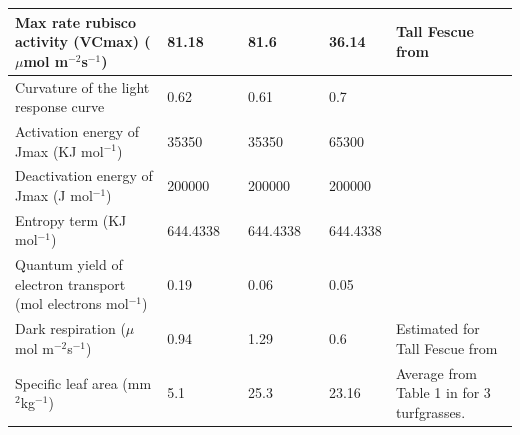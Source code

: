 \documentclass[final,3p,times,authoryear]{elsarticle}
\begin{document}
\begin{center}
\begin{table}[!htbp]
{\begin{tabular}{ |  p{3.5cm} | p{1.1cm} | p{2.5cm} | p{1.1cm} | p{2.5cm} | p{1.1cm} | p{2.5cm} | }
Max rate rubisco activity (VCmax) ($\mu$mol m$^{-2}$s$^{-1}$)& 81.18& \cite{Coutts2014a}  & 81.6&\cite{Coutts2016}& 36.14& Tall Fescue from \cite{Yu2012a}\\ \hline
Curvature of the light response curve &0.62& \cite{Coutts2014a}   &0.61 &\cite{Coutts2016}&0.7 &\cite{Gilmanov2007}\\ \hline
Activation energy of Jmax (KJ mol$^{-1}$)& 35350& \cite{Diaz-Espejo2006}  & 35350& \cite{Bernacchi2001}& 65300& \cite{Bernacchi2001}\\ \hline
Deactivation energy of Jmax (J mol$^{-1}$)& 200000 &\cite{Medlyn2005a}  & 200000& \cite{Medlyn2005a}& 200000& \cite{Medlyn2005a}\\ \hline
Entropy term (KJ mol$^{-1}$)& 644.4338& \cite{Medlyn2005a}   & 644.4338& \cite{Medlyn2005a}& 644.4338& \cite{Medlyn2005a}\\ \hline
Quantum yield of electron transport (mol electrons mol$^{-1}$)& 0.19& \cite{Sierra2012}  &0.06&\cite{Coutts2016}&0.05& \cite{Monson1982}\\ \hline
Dark respiration ($\mu$mol m$^{-2}$s$^{-1}$)& 0.94& \cite{Coutts2014a}  &1.29 &\cite{Coutts2016}&0.6  & Estimated for Tall Fescue from \cite{Yu2012a}\\ \hline
Specific leaf area (mm$^{2}$kg$^{-1}$)&5.1 &\cite{Mariscal2000}  &25.3 &\cite{Wright2000}&23.16 &Average from Table 1 in \cite{Bijoor2014} for 3 turfgrasses.\\ \hline
\end{tabular} 
}
\end{table}
\end{center}




%
\end{document}
